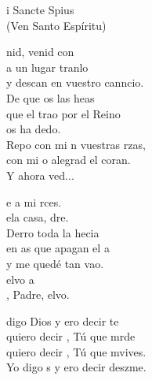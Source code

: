 \documentclass[12pt]{article}
\begin{document}
\begin{multicols*}{2}
\begin{cancion}%
	i Sancte Spius\\
(Ven Santo Espíritu)\\
\end{cancion}%

\begin{cancion}%
	nid, venid con \\
	a un lugar tranlo\\
	y descan en  vuestro canncio. \\
	De que os  las heas\\
	que el trao por el Reino \\
	os ha dedo.\\
	Repo con mi n vuestras rzas,\\
	con mi o alegrad el coran. \\
	Y ahora ved...\\
\end{cancion}%

\begin{cancion}[Vuelvo][Ixcís]%
	e a mi rces. \\
	ela casa, dre.\\
	Derro toda la hecia \\
	en as que apagan el a\\
	y me quedé tan vao. \\
	elvo a \\
	, Padre, elvo.\\
\end{cancion}%

\begin{cancion}%
	 digo Dios y ero decir te  \\
	quiero decir , Tú que mrde\\
	quiero decir , Tú que mvives.\\
	Yo digo s y ero decir deszme.\\
	  \\
\end{cancion}%

\end{multicols*}
\end{document}
